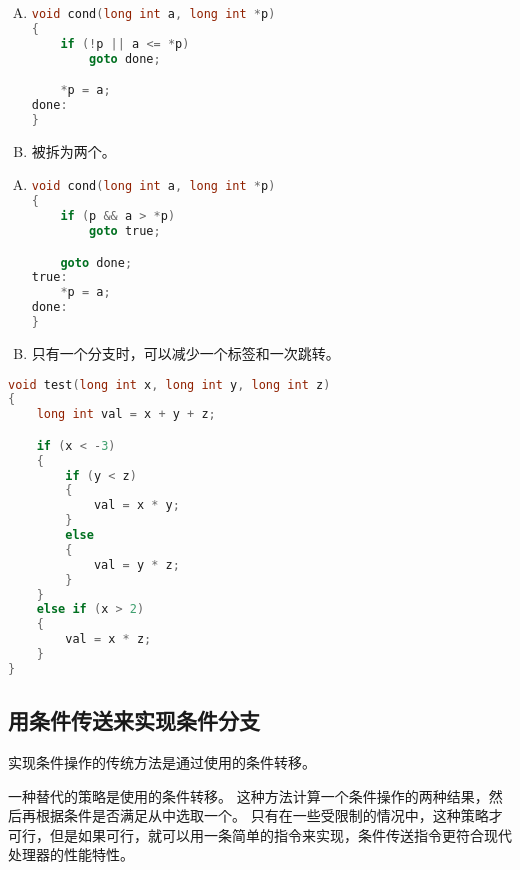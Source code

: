{{        %
        \begin{practicec}
            \begin{enumerate}[A.]
                \item
                {
                    \begin{lstlisting}[language=C]
void cond(long int a, long int *p)
{
    if (!p || a <= *p)
        goto done;

    *p = a;
done:
}
                    \end{lstlisting}
                }
                \item
                {
                    \emcode{\&\&}被拆为两个。
                }
            \end{enumerate}
        \end{practicec}

        \begin{practicec}
            \begin{enumerate}[A.]
                \item
                {
                    \begin{lstlisting}[language=C]
void cond(long int a, long int *p)
{
    if (p && a > *p)
        goto true;

    goto done;
true:
    *p = a;
done:
}
                    \end{lstlisting}
                }
                \item
                {
                    只有一个分支时，可以减少一个标签和一次跳转。
                }
            \end{enumerate}
        \end{practicec}

        \begin{practicec}
            \begin{lstlisting}[language=C]
void test(long int x, long int y, long int z)
{
    long int val = x + y + z;

    if (x < -3)
    {
        if (y < z)
        {
            val = x * y;
        }
        else
        {
            val = y * z;
        }
    }
    else if (x > 2)
    {
        val = x * z;
    }
}
            \end{lstlisting}
        \end{practicec}
    }

    \subsection{用条件传送来实现条件分支}
    {
        实现条件操作的传统方法是通过使用的条件转移。

        一种替代的策略是使用的条件转移。
        这种方法计算一个条件操作的两种结果，然后再根据条件是否满足从中选取一个。
        只有在一些受限制的情况中，这种策略才可行，但是如果可行，就可以用一条简单的指令来实现，条件传送指令更符合现代处理器的性能特性。
    }
}
